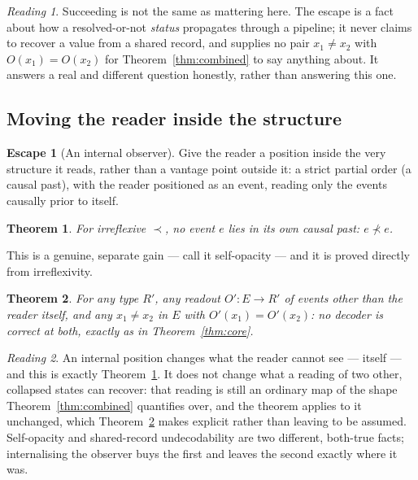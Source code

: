 \documentclass[10pt,twocolumn]{article}
\theoremstyle{plain}
\newtheorem{theorem}{Theorem}
\theoremstyle{definition}
\newtheorem{escape}{Escape}
\theoremstyle{remark}
\newtheorem*{reading}{Reading}
\begin{document}
\begin{reading}
Succeeding is not the same as mattering here. The escape is a fact about how a resolved-or-not \emph{status} propagates through a pipeline; it never claims to recover a value from a shared record, and supplies no pair $x_1 \neq x_2$ with $O(x_1) = O(x_2)$ for Theorem~\ref{thm:combined} to say anything about. It answers a real and different question honestly, rather than answering this one.
\end{reading}

\subsection{Moving the reader inside the structure}

\begin{escape}[An internal observer]
Give the reader a position inside the very structure it reads, rather than a vantage point outside it: a strict partial order (a causal past), with the reader positioned as an event, reading only the events causally prior to itself.
\end{escape}

\begin{theorem}\label{thm:escape3a}
For irreflexive $\prec$, no event $e$ lies in its own causal past: $e \not\prec e$.
\end{theorem}

This is a genuine, separate gain --- call it self-opacity --- and it is proved directly from irreflexivity.

\begin{theorem}\label{thm:escape3b}
For any type $R'$, any readout $O' : E \to R'$ of events other than the reader itself, and any $x_1 \neq x_2$ in $E$ with $O'(x_1) = O'(x_2)$: no decoder is correct at both, exactly as in Theorem~\ref{thm:core}.
\end{theorem}

\begin{reading}
An internal position changes what the reader cannot see --- itself --- and this is exactly Theorem~\ref{thm:escape3a}. It does not change what a reading of two other, collapsed states can recover: that reading is still an ordinary map of the shape Theorem~\ref{thm:combined} quantifies over, and the theorem applies to it unchanged, which Theorem~\ref{thm:escape3b} makes explicit rather than leaving to be assumed. Self-opacity and shared-record undecodability are two different, both-true facts; internalising the observer buys the first and leaves the second exactly where it was.
\end{reading}
\end{document}
